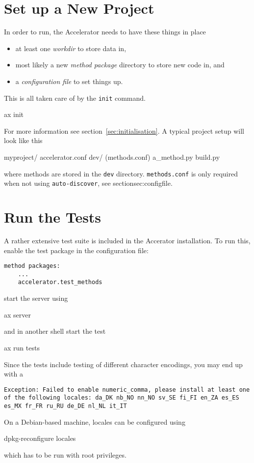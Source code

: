 \section{Set up a New Project}
In order to run, the Accelerator needs to have these things in place
\begin{itemize}
\item[] at least one \textsl{workdir} to store data in,
\item[] most likely a new \textsl{method package} directory to store new code in, and
\item[] a \textsl{configuration file} to set things up.
\end{itemize}
This is all taken care of by the \texttt{init} command.
\begin{shell}
ax init
\end{shell}
For more information see section~\ref{sec:initialisation}.  A typical
project setup will look like this
\begin{shell}
myproject/
    accelerator.conf
    dev/
        (methods.conf)
        a_method.py
        build.py
\end{shell}
where methods are stored in the \texttt{dev} directory.
\texttt{methods.conf} is only required when not using
\texttt{auto-discover}, see section{sec:configfile}.



\section{Run the Tests}
A rather extensive test suite is included in the Accerator
installation.  To run this, enable the test package in the
configuration file:
\begin{verbatim}
method packages:
    ...
    accelerator.test_methods
\end{verbatim}
start the server using
\begin{python}
ax server
\end{python}
and in another shell start the test
\begin{python}
ax run tests
\end{python}
Since the tests include testing of different character encodings, you may end up with a
\begin{verbatim}
Exception: Failed to enable numeric_comma, please install at least one
of the following locales: da_DK nb_NO nn_NO sv_SE fi_FI en_ZA es_ES
es_MX fr_FR ru_RU de_DE nl_NL it_IT
\end{verbatim}
On a Debian-based machine, locales can be configured using
\begin{shell}
dpkg-reconfigure locales 
\end{shell}
which has to be run with root privileges.



